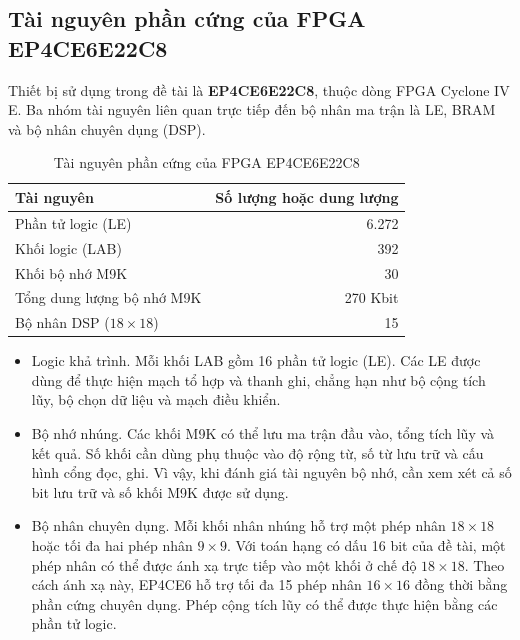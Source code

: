\subsection{Tài nguyên phần cứng của FPGA EP4CE6E22C8}

Thiết bị sử dụng trong đề tài là \textbf{EP4CE6E22C8}, thuộc dòng FPGA Cyclone IV E. Ba nhóm tài nguyên liên quan trực tiếp đến bộ nhân ma trận là LE, BRAM và bộ nhân chuyên dụng (DSP).

\begin{table}[H]
    \centering
    \caption{Tài nguyên phần cứng của FPGA EP4CE6E22C8}
    \label{tab:fpga_resources}

    \begin{tabularx}{\textwidth}{X r}
        \toprule
        \textbf{Tài nguyên} &
        \textbf{Số lượng hoặc dung lượng} \\
        \midrule
        Phần tử logic (LE) & 6.272 \\
        Khối logic (LAB) & 392 \\
        Khối bộ nhớ M9K & 30 \\
        Tổng dung lượng bộ nhớ M9K & 270 Kbit \\
        Bộ nhân DSP ($18 \times 18$) & 15 \\
        \bottomrule
    \end{tabularx}
\end{table}

\begin{itemize}
    \item Logic khả trình. Mỗi khối LAB gồm 16 phần tử logic (LE). Các LE được dùng để thực hiện mạch tổ hợp và thanh ghi, chẳng hạn như bộ cộng tích lũy, bộ chọn dữ liệu và mạch điều khiển.
    \item Bộ nhớ nhúng. Các khối M9K có thể lưu ma trận đầu vào, tổng tích lũy và kết quả. Số khối cần dùng phụ thuộc vào độ rộng từ, số từ lưu trữ và cấu hình cổng đọc, ghi. Vì vậy, khi đánh giá tài nguyên bộ nhớ, cần xem xét cả số bit lưu trữ và số khối M9K được sử dụng.
    \item Bộ nhân chuyên dụng. Mỗi khối nhân nhúng hỗ trợ một phép nhân $18 \times 18$ hoặc tối đa hai phép nhân $9 \times 9$. Với toán hạng có dấu 16 bit của đề tài, một phép nhân có thể được ánh xạ trực tiếp vào một khối ở chế độ $18 \times 18$. Theo cách ánh xạ này, EP4CE6 hỗ trợ tối đa 15 phép nhân $16 \times 16$ đồng thời bằng phần cứng chuyên dụng. Phép cộng tích lũy có thể được thực hiện bằng các phần tử logic.
\end{itemize}

